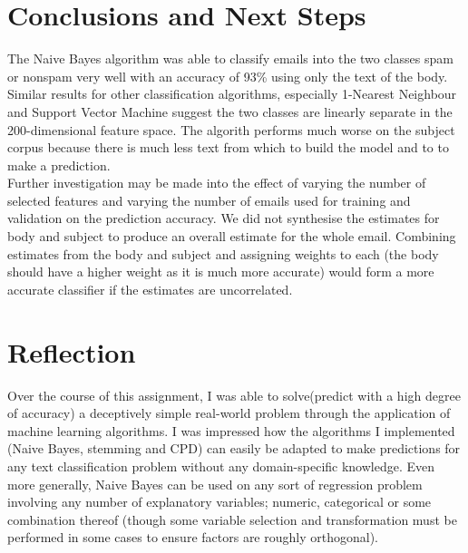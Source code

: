 \documentclass[12pt]{article}
\begin{document}
\section{Conclusions and Next Steps}
The Naive Bayes algorithm was able to classify emails into the two classes spam or nonspam very well with an accuracy of 93\% using only the text of the body. Similar results for other classification algorithms, especially 1-Nearest Neighbour and Support Vector Machine suggest the two classes are linearly separate in the 200-dimensional feature space. The algorith performs much worse on the subject corpus because there is much less text from which to build the model and to to make a prediction.\\
Further investigation may be made into the effect of varying the number of selected features and varying the number of emails used for training and validation on the prediction accuracy. We did not synthesise the estimates for body and subject to produce an overall estimate for the whole email. Combining estimates from the body and subject and assigning weights to each (the body should have a higher weight as it is much more accurate) would form a more accurate classifier if the estimates are uncorrelated.

\section{Reflection}
Over the course of this assignment, I was able to solve(predict with a high degree of accuracy) a deceptively simple real-world problem through the application of machine learning algorithms. I was impressed how the algorithms I implemented (Naive Bayes, stemming and CPD) can easily be adapted to make predictions for any text classification problem without any domain-specific knowledge. Even more generally, Naive Bayes can be used on any sort of regression problem involving any number of explanatory variables; numeric, categorical or some combination thereof (though some variable selection and transformation must be performed in some cases to ensure factors are roughly orthogonal).




\end{document}
